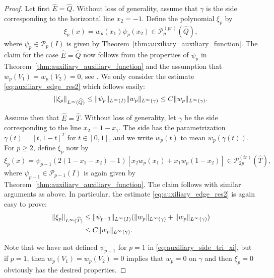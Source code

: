 \documentclass[english, 12pt, a4paper, sci, utf8, a-2b, online]{aaltothesis}
\theoremstyle{definition}
\theoremstyle{plain}
\DeclarePairedDelimiter\norm{\lVert}{\rVert}
\numberwithin{equation}{section}
\begin{document}
\begin{proof}
    Let first $\widehat{E} = \widehat{Q}$.
    Without loss of generality, assume that $\gamma$ is the side corresponding to the
    horizontal line $x_2 = -1$. Define the polynomial $\xi_p$ by
    \begin{equation*}
        \xi_p(x) = w_p(x_1) \psi_p(x_2) \in \mathcal{P}_p^{(pr)}(\widehat{Q}),
    \end{equation*}
    where $\psi_p \in \mathcal{P}_p(I)$ is given by Theorem~\ref{thm:auxiliary_auxiliary_function}.
    The claim for the case $\widehat{E} = \widehat{Q}$ now follows from the properties of
    $\psi_p$ in Theorem~\ref{thm:auxiliary_auxiliary_function} and the assumption that
    $w_p(V_1) = w_p(V_2) = 0$, see \cite{babuskasuri1987}. We only consider the estimate
    \eqref{eq:auxiliary_edge_res2} which follows easily:
    \begin{equation*}
        \norm{\xi_p}_{L^{\infty}(\widehat{Q})}
        \leq \norm{\psi_p}_{L^{\infty}(I)} \norm{w_p}_{L^{\infty}(\gamma)}
        \leq C \norm{w_p}_{L^{\infty}(\gamma)}.
    \end{equation*}

    Assume then that $\widehat{E} = \widehat{T}$.
    Without loss of generality, let $\gamma$ be the side corresponding
    to the line $x_2=1-x_1$. The side has the parametrization
    $\gamma(t) = [t,1-t]^T$ for $t \in [0,1]$, and we write
    $w_p(t)$ to mean $w_p(\gamma(t))$.
    For $p \geq 2$, define $\xi_p$ now by
    \begin{equation}
        \label{eq:auxiliary_side_tri_xi}
        \xi_p(x) = \psi_{p-1}(2(1-x_1-x_2)-1) [ x_2 w_p(x_1) + x_1 w_p(1-x_2) ]
        \in \mathcal{P}_{2p}^{(tr)}(\widehat{T}),
    \end{equation}
    where $\psi_{p-1} \in \mathcal{P}_{p-1}(I)$ is again given by
    Theorem~\ref{thm:auxiliary_auxiliary_function}.
    The claim follows with similar arguments as above.
    In particular, the estimate \eqref{eq:auxiliary_edge_res2} is again easy to prove:
    \begin{align*}
        \norm{\xi_p}_{L^{\infty}(\widehat{T})}
        &\leq \norm{\psi_{p-1}}_{L^{\infty}(I)}
            (\norm{w_p}_{L^{\infty}(\gamma)} + \norm{w_p}_{L^{\infty}(\gamma)}) \\
        &\leq C \norm{w_p}_{L^{\infty}(\gamma)}.
    \end{align*}
    
    Note that we have not defined $\psi_{p-1}$ for $p=1$ in \eqref{eq:auxiliary_side_tri_xi},
    but if $p=1$, then $w_p(V_1) = w_p(V_2) = 0$ implies that $w_p = 0$ on $\gamma$ and
    then $\xi_p = 0$ obviously has the desired properties.
\end{proof}
\end{document}
